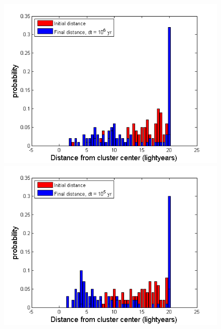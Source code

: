 \begin{figure}[H]
\centering
\begin{minipage}{.5\textwidth}
  \centering
  \includegraphics[width=1\linewidth]{Figures/graphs_RK4/pos6.png}
\end{minipage}%
\begin{minipage}{.5\textwidth}
  \centering
  \includegraphics[width=1\linewidth]{Figures/graphs_RK4/pos5.png}
\end{minipage}
\begin{minipage}{.5\textwidth}
  \centering

\end{minipage}
\end{figure}
